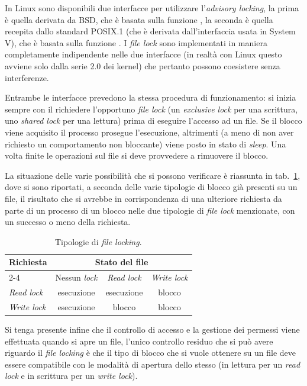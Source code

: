 In Linux sono disponibili due interfacce per utilizzare l'\textit{advisory
  locking}, la prima è quella derivata da BSD, che è basata sulla funzione
, la seconda è quella recepita dallo standard POSIX.1 (che è
derivata dall'interfaccia usata in System V), che è basata sulla funzione
.  I \textit{file lock} sono implementati in maniera completamente
indipendente nelle due interfacce (in realtà con Linux questo avviene solo
dalla serie 2.0 dei kernel) che pertanto possono coesistere senza
interferenze.

Entrambe le interfacce prevedono la stessa procedura di funzionamento: si
inizia sempre con il richiedere l'opportuno \textit{file lock} (un
\textit{exclusive lock} per una scrittura, uno \textit{shared lock} per una
lettura) prima di eseguire l'accesso ad un file.  Se il blocco viene acquisito
il processo prosegue l'esecuzione, altrimenti (a meno di non aver richiesto un
comportamento non bloccante) viene posto in stato di \textit{sleep}. Una volta
finite le operazioni sul file si deve provvedere a rimuovere il blocco.

La situazione delle varie possibilità che si possono verificare è riassunta in
tab.~\ref{tab:file_file_lock}, dove si sono riportati, a seconda delle varie
tipologie di blocco già presenti su un file, il risultato che si avrebbe in
corrispondenza di una ulteriore richiesta da parte di un processo di un blocco
nelle due tipologie di \textit{file lock} menzionate, con un successo o meno
della richiesta.

\begin{table}[htb]
  \centering
  \footnotesize
   \begin{tabular}[c]{|l|c|c|c|}
    \hline
    \textbf{Richiesta} & \multicolumn{3}{|c|}{\textbf{Stato del file}}\\
    \cline{2-4}
                &Nessun \textit{lock}&\textit{Read lock}&\textit{Write lock}\\
    \hline
    \hline
    \textit{Read lock} & esecuzione & esecuzione & blocco \\
    \textit{Write lock}& esecuzione & blocco & blocco \\
    \hline    
  \end{tabular}
  \caption{Tipologie di \textit{file locking}.}
  \label{tab:file_file_lock}
\end{table}

Si tenga presente infine che il controllo di accesso e la gestione dei
permessi viene effettuata quando si apre un file, l'unico controllo residuo
che si può avere riguardo il \textit{file locking} è che il tipo di blocco che
si vuole ottenere su un file deve essere compatibile con le modalità di
apertura dello stesso (in lettura per un \textit{read lock} e in scrittura per
un \textit{write lock}).

